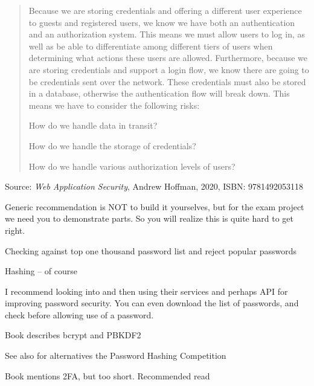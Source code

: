 \documentclass[Screen16to9,17pt]{foils}
\begin{document}


\begin{quote}
Because we are storing credentials and offering a different user experience to guests
and registered users, we know we have both an authentication and an authorization
system. This means we must allow users to log in, as well as be able to differentiate
among different tiers of users when determining what actions these users are allowed.
Furthermore, because we are storing credentials and support a login flow, we know
there are going to be credentials sent over the network. These credentials must also be
stored in a database, otherwise the authentication flow will break down.
This means we have to consider the following risks:
\begin{list2}
\item How do we handle data in transit?
\item How do we handle the storage of credentials?
\item How do we handle various authorization levels of users?
\end{list2}
\end{quote}
Source: \emph{Web Application Security}, Andrew Hoffman, 2020, ISBN: 9781492053118

Generic recommendation is NOT to build it yourselves, but for the exam project we need you to demonstrate parts. So you will realize this is quite hard to get right.





\begin{list2}
\item Checking against top one thousand password list and reject popular passwords
\item Hashing -- of course
\item I recommend looking into  and then using their services and perhaps API for improving password security. You can even download the list of passwords, and check before allowing use of a password.\\
\item Book describes bcrypt  and PBKDF2 

\item See also for alternatives the Password Hashing Competition\\
\item Book mentions 2FA, but too short. Recommended read 
\end{list2}
\end{document}
